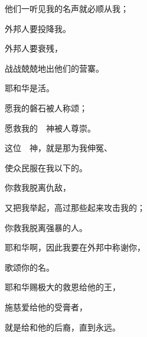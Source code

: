 {\par }{\Q {}他们一听见我的名声就必顺从我；
\par }{\Q 外邦人要投降我。
\par }{\Q {}外邦人要衰残，
\par }{\Q 战战兢兢地出他们的营寨。
\par }{\BB \par }{\Q {}耶和华是活{}。
\par }{\Q 愿我的磐石被人称颂；
\par }{\Q 愿救我的　神被人尊崇。
\par }{\Q {}这位　神，就是那为我伸冤、
\par }{\Q 使众民服在我以下的。
\par }{\Q {}你救我脱离仇敌，
\par }{\Q 又把我举起，高过那些起来攻击我的；
\par }{\Q 你救我脱离强暴的人。
\par }{\BB \par }{\Q {}耶和华啊，因此我要在外邦中称谢你，
\par }{\Q 歌颂你的名。
\par }{\Q {}耶和华赐极大的救恩给他{}的王，
\par }{\Q 施慈爱给他的受膏者，
\par }{\Q 就是给{}和他的后裔，直到永远。

}
